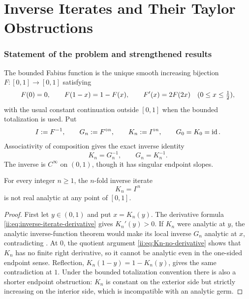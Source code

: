 
\part{Inverse Iterates and Their Taylor Obstructions}


\section{Statement of the problem and strengthened results}
\label{ii:sec:statement}

The bounded Fabius function is the unique smooth increasing bijection
$F\colon[0,1]\to[0,1]$ satisfying
\begin{equation}
 F(0)=0,\qquad F(1-x)=1-F(x),\qquad F'(x)=2F(2x)
 \quad(0\leq x\leq\tfrac12),
 \label{ii:eq:basic-F}
\end{equation}
with the usual constant continuation outside $[0,1]$ when the bounded totalization is
used.  Put
\begin{equation}
 I:=F^{-1},\qquad G_n:=F^{\mathbin{\circ} n},\qquad K_n:=I^{\mathbin{\circ} n},
 \qquad G_0=K_0=\operatorname{id}.
 \label{ii:eq:iterates}
\end{equation}
Associativity of composition gives the exact inverse identity
\begin{equation}
 K_n=G_n^{-1},\qquad G_n=K_n^{-1}.
 \label{ii:eq:iterate-inverse-identity}
\end{equation}
The inverse is $C^\infty$ on $(0,1)$, though it has singular endpoint slopes.

\begin{theorem}
\label{ii:thm:inverse-main}
For every integer $n\geq1$, the $n$-fold inverse iterate
\[
 K_n=I^{\comp n}
\]
is not real analytic at any point of $[0,1]$.
\end{theorem}

\begin{proof}
First let $y\in(0,1)$ and put $x=K_n(y)$.  The derivative formula
\eqref{ii:eq:inverse-iterate-derivative} gives $K_n'(y)>0$.  If $K_n$ were
analytic at $y$, the analytic inverse-function theorem would make its local
inverse $G_n$ analytic at $x$, contradicting .  At $0$,
the quotient argument \eqref{ii:eq:Kn-no-derivative} shows that $K_n$ has no
finite right derivative, so it cannot be analytic even in the one-sided
endpoint sense.  Reflection, $K_n(1-y)=1-K_n(y)$, gives the same contradiction
at $1$.  Under the bounded totalization convention there is also a shorter
endpoint obstruction: $K_n$ is constant on the exterior side but strictly
increasing on the interior side, which is incompatible with an analytic germ.
\end{proof}

